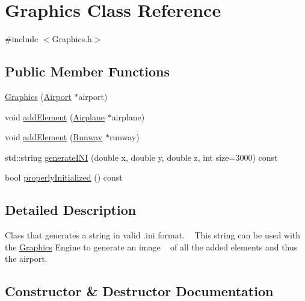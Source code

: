 \hypertarget{classGraphics}{}\section{Graphics Class Reference}
\label{classGraphics}


{\ttfamily \#include $<$Graphics.\+h$>$}

\subsection*{Public Member Functions}
\begin{DoxyCompactItemize}
\item 
\hyperlink{classGraphics_aeb4dc61589dbc318e3b9b91da1079a73}{Graphics} (\hyperlink{classAirport}{Airport} $\ast$airport)
\item 
void \hyperlink{classGraphics_a0fe625122d443cffbc405e9f49808cd7}{add\+Element} (\hyperlink{classAirplane}{Airplane} $\ast$airplane)
\item 
void \hyperlink{classGraphics_a3dca71401d21a07a2c0a9d1f44df0d3c}{add\+Element} (\hyperlink{classRunway}{Runway} $\ast$runway)
\item 
std\+::string \hyperlink{classGraphics_a7650057214dabce915dfc6f104e0b1eb}{generate\+I\+NI} (double x, double y, double z, int size=3000) const 
\item 
bool \hyperlink{classGraphics_ac10231e8c943b3218a0d0260abf2065f}{properly\+Initialized} () const 
\end{DoxyCompactItemize}


\subsection{Detailed Description}
Class that generates a string in valid .ini format. ~\newline
 This string can be used with the \hyperlink{classGraphics}{Graphics} Engine to generate an image ~\newline
 of all the added elements and thus the airport. 

\subsection{Constructor \& Destructor Documentation}
